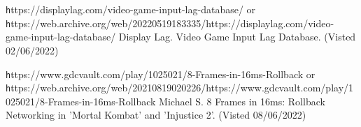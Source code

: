 \documentclass{entcs}
\begin{document}
\begin{thebibliography}{25}
 {\texttt https://displaylag.com/video-game-input-lag-database/} or {\texttt https://web.archive.org/web/20220519183335/https://displaylag.com/video-game-input-lag-database/} Display Lag. Video Game Input Lag Database. (Visted 02/06/2022)

 {\texttt https://www.gdcvault.com/play/1025021/8-Frames-in-16ms-Rollback} or {\texttt https://web.archive.org/web/20210819020226/https://www.gdcvault.com/play/1025021/8-Frames-in-16ms-Rollback} Michael S. 8 Frames in 16ms: Rollback Networking in 'Mortal Kombat' and 'Injustice 2'. (Visted 08/06/2022)

\end{thebibliography}
\end{document}
